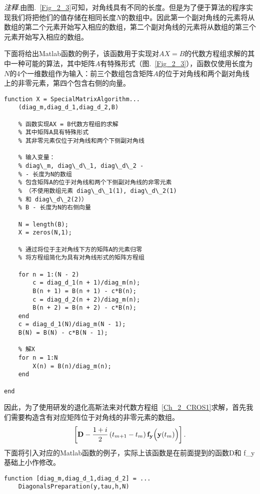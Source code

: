 \documentclass[twoside]{book}
\def\textbf{\bf}%
\begin{document}
\begin{CJK*}{GBK}{song}
\emph{注释.}由图.~\ref{Fig_2_3}可知，对角线具有不同的长度。但是为了便于算法的程序实现我们将把他们的值存储在相同长度$N$的数组中。因此第一个副对角线的元素将从数组的第二个元素开始写入相应的数组，第二个副对角线的元素将从数组的第三个元素开始写入相应的数组。

下面将给出Matlab函数的例子，该函数用于实现对$AX = B$的代数方程组求解的其中一种可能的算法，其中矩阵$A$有特殊形式（图.~\ref{Fig_2_3}），函数仅使用长度为$N$的4个一维数组作为输入：前三个数组包含矩阵$A$的位于对角线和两个副对角线上的非零元素，第四个包含右侧的向量。
%
\begin{lstlisting}
function X = SpecialMatrixAlgorithm...
    (diag_m,diag_d_1,diag_d_2,B)

    % 函数实现AX = B代数方程组的求解
    % 其中矩阵A具有特殊形式
    % 其非零元素仅位于对角线和两个下侧副对角线

    % 输入变量：
    % diag\_m, diag\_d\_1, diag\_d\_2 -
    % - 长度为N的数组
    % 包含矩阵A的位于对角线和两个下侧副对角线的非零元素
    % （不使用数组元素 diag\_d\_1(1), diag\_d\_2(1)
    % 和 diag\_d\_2(2)）
    % B - 长度为N的右侧向量

    N = length(B);
    X = zeros(N,1);

    % 通过将位于主对角线下方的矩阵A的元素归零
    % 将方程组简化为具有对角线形式的矩阵方程组

    for n = 1:(N - 2)
        c = diag_d_1(n + 1)/diag_m(n);
        B(n + 1) = B(n + 1) - c*B(n);
        c = diag_d_2(n + 2)/diag_m(n);
        B(n + 2) = B(n + 2) - c*B(n);
    end
    c = diag_d_1(N)/diag_m(N - 1);
    B(N) = B(N) - c*B(N - 1);

    % 解X
    for n = 1:N
        X(n) = B(n)/diag_m(n);
    end

end
\end{lstlisting}



因此，为了使用研发的退化高斯法来对代数方程组~\eqref{Ch_2_CROS1}求解，首先我们需要构造含有对应矩阵位于对角线的非零元素的数组。
\begin{equation*}
    \left[\emph{\textbf{D}} - \dfrac{1 + i}{2} \, (t_{m + 1} - t_m) \, \emph{\textbf{f}}_\emph{\textbf{y}}\Big(\emph{\textbf{y}}(t_m)\Big)\right].
\end{equation*}
下面将引入对应的Matlab函数的例子，实际上该函数是在前面提到的函数D和 f\_y基础上小作修改。

%
\begin{lstlisting}
function [diag_m,diag_d_1,diag_d_2] = ...
    DiagonalsPreparation(y,tau,h,N)


\end{lstlisting}
\end{CJK*}
\end{document}
